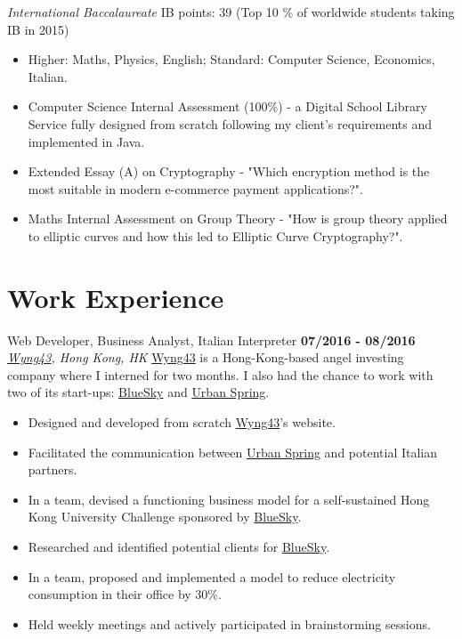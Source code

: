 \documentclass[]{friggeri-cv}
\begin{document}
\begin{entrylist}
    {\emph{International Baccalaureate}}
    {IB points: 39  (Top 10 \% of worldwide students taking IB in 2015)}
    \begin{itemize}
        \item Higher: Maths, Physics, English; Standard: Computer Science, Economics, Italian.
        \item Computer Science Internal Assessment (100\%) - a Digital School Library Service fully designed from scratch following my client's requirements and implemented in Java.
        \item Extended Essay (A) on Cryptography - "Which encryption method is the most suitable in modern e-commerce payment applications?".
        \item Maths Internal Assessment on Group Theory - "How is group theory applied to elliptic curves and how this led to Elliptic Curve Cryptography?". \\
    \end{itemize}
\end{entrylist}

\section{\color{red}Work \color{gray} Experience}
\begin{entrylist}
  \entry
    {}
    {Web Developer, Business Analyst, Italian Interpreter}
    {\textbf{07/2016 - 08/2016}}
    {\emph{\href{http://www.wyng43.com/}{Wyng43}, Hong Kong, HK}}
    {\href{http://www.wyng43.com/}{Wyng43} is a Hong-Kong-based angel investing company where I interned for two months. I also had the chance to work with two of its start-ups: \href{http://www.hibluesky.co/}{BlueSky} and \href{http://www.urbanspring.hk/}{Urban Spring}.}
    \begin{itemize}
        \item Designed and developed from scratch \href{http://www.wyng43.com/}{Wyng43}'s website.
        \item Facilitated the communication between \href{http://www.urbanspring.hk/}{Urban Spring} and potential Italian partners.
        \item In a team, devised a functioning business model for a self-sustained Hong Kong University Challenge sponsored by \href{http://www.hibluesky.co/}{BlueSky}.
        \item Researched and identified potential clients for \href{http://www.hibluesky.co/}{BlueSky}.
        \item In a team, proposed and implemented a model to reduce electricity consumption in their office by 30\%.
        \item Held weekly meetings and actively participated in brainstorming sessions.
    \end{itemize}
\end{entrylist}
\end{document}
